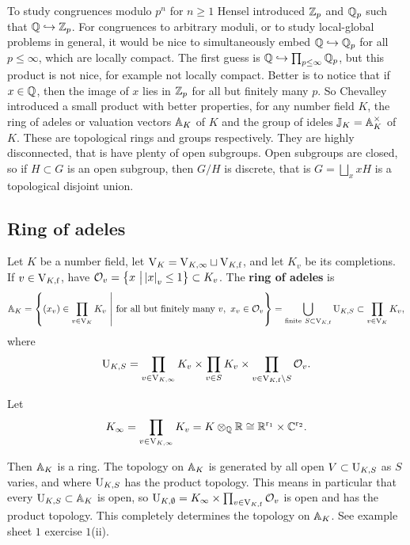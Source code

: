 To study congruences modulo $ p^n $ for $ n \ge 1 $ Hensel introduced $ \ZZ_p $ and $ \QQ_p $ such that $ \QQ \hookrightarrow \ZZ_p $. For congruences to arbitrary moduli, or to study local-global problems in general, it would be nice to simultaneously embed $ \QQ \hookrightarrow \QQ_p $ for all $ p \le \infty $, which are locally compact. The first guess is $ \QQ \hookrightarrow \prod_{p \le \infty} \QQ_p $, but this product is not nice, for example not locally compact. Better is to notice that if $ x \in \QQ $, then the image of $ x $ lies in $ \ZZ_p $ for all but finitely many $ p $. So Chevalley introduced a small product with better properties, for any number field $ K $, the ring of adeles or valuation vectors $ \AA_K $ of $ K $ and the group of ideles $ \JJ_K = \AA_K^\times $ of $ K $. These are topological rings and groups respectively. They are highly disconnected, that is have plenty of open subgroups. Open subgroups are closed, so if $ H \subset G $ is an open subgroup, then $ G / H $ is discrete, that is $ G = \bigsqcup_x xH $ is a topological disjoint union.

\subsection{Ring of adeles}

\begin{definition*}
Let $ K $ be a number field, let $ \V_K = \V_{K, \infty} \sqcup \V_{K, \f} $, and let $ K_v $ be its completions. If $ v \in \V_{K, \f} $, have $ \OOO_v = \cbr{x \st \abs{x}_v \le 1} \subset K_v $. The \textbf{ring of adeles} is
$$ \AA_K = \cbr{\br{x_v} \in \prod_{v \in \V_K} K_v \st \text{for all but finitely many} \ v, \ x_v \in \OOO_v} = \bigcup_{\text{finite} \ S \subset \V_{K, \f}} \U_{K, S} \subset \prod_{v \in \V_K} K_v, $$
where
$$ \U_{K, S} = \prod_{v \in \V_{K, \infty}} K_v \times \prod_{v \in S} K_v \times \prod_{v \in \V_{K, \f} \setminus S} \OOO_v. $$
\end{definition*}

\begin{notation*}
Let
$$ K_\infty = \prod_{v \in \V_{K, \infty}} K_v = K \otimes_\QQ \RR \cong \RR^{\r_1} \times \CC^{\r_2}. $$
\end{notation*}

Then $ \AA_K $ is a ring. The topology on $ \AA_K $ is generated by all open $ V \subset \U_{K, S} $ as $ S $ varies, and where $ \U_{K, S} $ has the product topology. This means in particular that every $ \U_{K, S} \subset \AA_K $ is open, so $ \U_{K, \emptyset} = K_\infty \times \prod_{v \in \V_{K, \f}} \OOO_v $ is open and has the product topology. This completely determines the topology on $ \AA_K $. See example sheet $ 1 $ exercise $ 1 $(ii).


